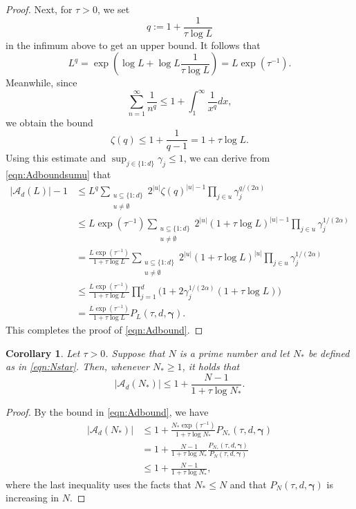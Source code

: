\documentclass[pdflatex,sn-basic,Numbered]{sn-jnl}%
\newcommand{\bsgamma}{\boldsymbol{\gamma}}
\newcommand{\Acal}{\mathcal{A}}
\theoremstyle{thmstyleone}%
\newtheorem{corollary}[theorem]{Corollary}
\theoremstyle{thmstyletwo}%
\begin{document}
\begin{proof}
Next, for $\tau>0$, we set
\[ q:=1+\frac{1}{\tau \log L} \]
in the infimum above to get an upper bound. It follows that
\[ L^{q}=\exp\left(\log L + \log L \frac{1}{\tau \log L}\right)=L\exp(\tau^{-1}). \]
Meanwhile, since
\[ \sum_{n=1}^\infty \frac{1}{n^q}\leq 1+\int_1^\infty \frac{1}{x^q}dx, \]
we obtain the bound
\[ \zeta(q)\leq 1+ \frac{1}{q-1}=1+\tau \log L. \]
Using this estimate and $\sup_{j\in \{1{:}d\}}\gamma_j\leq 1$, we can derive from \eqref{eqn:Adboundsumu} that
\begin{align*}
    |\Acal_d(L)|-1 &\leq L^q \sum_{\substack{u\subseteq \{1{:}d\}\\u\neq \emptyset}} 2^{|u|} 
    \zeta(q)^{|u|-1}  \prod_{j\in u} \gamma_j^{q/(2\alpha)} \\
    & \leq L\exp(\tau^{-1}) \sum_{\substack{u\subseteq \{1{:}d\}\\u\neq \emptyset}} 2^{|u|}  (1+\tau \log L)^{|u|-1}\prod_{j\in u} \gamma_j^{1/(2\alpha)}  \\
    & =\frac{ L\exp(\tau^{-1})}{1+\tau\log L}  \sum_{\substack{u\subseteq \{1{:}d\}\\u\neq \emptyset}} 2^{|u|} (1+\tau \log L)^{|u|} \prod_{j\in u} \gamma_j^{1/(2\alpha)} \\
    & \leq  \frac{ L\exp(\tau^{-1})}{1+\tau\log L}  \prod_{j=1}^d \Big(1+2\gamma^{1/(2\alpha)}_j (1+\tau\log L)\Big)\\
    &= \frac{ L\exp(\tau^{-1})}{1+\tau\log L} P_{L}(\tau,d,\bsgamma).
\end{align*}
This completes the proof of \eqref{eqn:Adbound}.
\end{proof}

\begin{corollary}\label{cor:AdNstarcount} 
    Let $\tau>0$.
    Suppose that $N$ is a prime number and let $N_*$ be defined as in \eqref{eqn:Nstar}. Then, whenever $N_*\geq 1$, it holds that 
    \[ |\Acal_d(N_*)|\leq 1+\frac{ N-1}{1+\tau\log N_*}.\]
\end{corollary}

\begin{proof}
    By the bound in \eqref{eqn:Adbound}, we have
    \begin{align*}
        |\Acal_d(N_*)|&\leq 1+ \frac{N_*\exp(\tau^{-1})}{1+\tau\log N_*} P_{N_*}(\tau,d,\bsgamma) \\
        & = 1+ \frac{N-1}{1+\tau\log N_*} \frac{P_{N_*}(\tau,d,\bsgamma)}{P_{N}(\tau,d,\bsgamma)} \\
        &\leq 1+ \frac{N-1}{1+\tau\log N_*},
    \end{align*}
    where the last inequality uses the facts that $N_*\leq N$ and that $P_{N}(\tau,d,\bsgamma)$ is increasing in $N$.
\end{proof}
\end{document}
